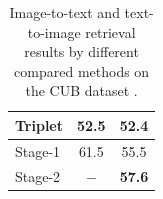 \begin{table}[]
\begin{tabular}{|l|c|c|c|c|}
Triplet	 & \multicolumn{2}{c|}{52.5}           & \multicolumn{2}{c|}{52.4} \\ \hline
\hline
Stage-1      & \multicolumn{2}{c|}{61.5}           & \multicolumn{2}{c|}{55.5}                                 \\ \hline
Stage-2     & \multicolumn{2}{c|}{$-$}               & \multicolumn{2}{c|}{{\textbf{57.6}}} \\ \hline
\end{tabular}
\caption{Image-to-text and text-to-image retrieval results by different compared methods on the CUB dataset \cite{reed2016learning}.}
\label{tab:CUB_dataset}
\end{table}

